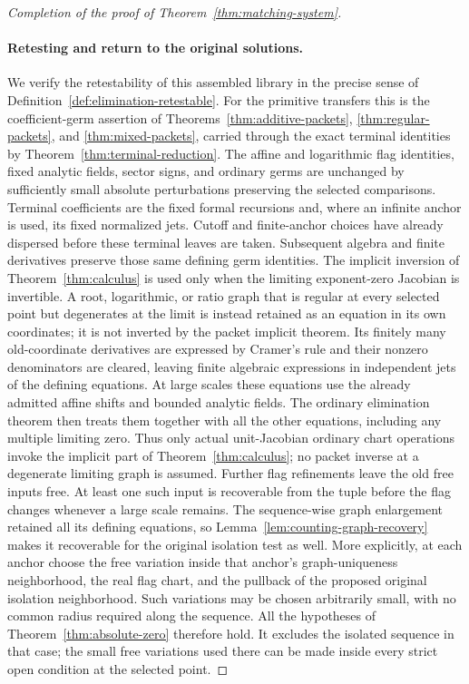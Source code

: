 \begin{proof}[Completion of the proof of Theorem~\ref{thm:matching-system}]
\paragraph{Retesting and return to the original solutions.}
We verify the retestability of this assembled library in the precise
sense of Definition~\ref{def:elimination-retestable}.  For the
primitive transfers this is the coefficient-germ assertion of
Theorems~\ref{thm:additive-packets}, \ref{thm:regular-packets}, and
\ref{thm:mixed-packets}, carried through the exact terminal identities
by Theorem~\ref{thm:terminal-reduction}.  The affine and logarithmic
flag identities, fixed analytic fields, sector signs, and ordinary germs
are unchanged by sufficiently small absolute perturbations preserving
the selected comparisons.  Terminal coefficients are the fixed
formal recursions and, where an infinite anchor is used, its fixed
normalized jets.  Cutoff and finite-anchor choices have already
dispersed before these terminal leaves are taken.  Subsequent
algebra and finite derivatives preserve those same defining germ
identities.  The implicit inversion of
Theorem~\ref{thm:calculus} is used only when the limiting
exponent-zero Jacobian is invertible.  A root, logarithmic, or ratio
graph that is regular at every selected point but degenerates at the
limit is instead retained as an equation in its own coordinates;
it is not inverted by the packet implicit theorem.  Its finitely
many old-coordinate derivatives are expressed by Cramer's rule and
their nonzero denominators are cleared, leaving finite algebraic
expressions in independent jets of the defining equations.  At
large scales these equations use the already admitted affine shifts
and bounded analytic fields.  The ordinary elimination theorem
then treats them together with all the other equations, including
any multiple limiting zero.  Thus only actual unit-Jacobian
ordinary chart operations invoke the implicit part of
Theorem~\ref{thm:calculus}; no packet inverse at a degenerate
limiting graph is assumed.  Further flag refinements leave the old
free inputs free.  At least one such input is recoverable from the
tuple before the flag changes whenever a large scale remains.  The
sequence-wise graph enlargement retained all its defining equations,
so Lemma~\ref{lem:counting-graph-recovery} makes it recoverable for
the original isolation test as well.  More explicitly, at each
anchor choose the free variation inside that anchor's graph-uniqueness
neighborhood, the real flag chart, and the pullback of the proposed
original isolation neighborhood.  Such variations may be chosen
arbitrarily small, with no common radius required along the sequence.
All the hypotheses of
Theorem~\ref{thm:absolute-zero} therefore hold.  It excludes the
isolated sequence in that case; the small free variations used there
can be made inside every strict open condition at the selected
point.


\end{proof}
